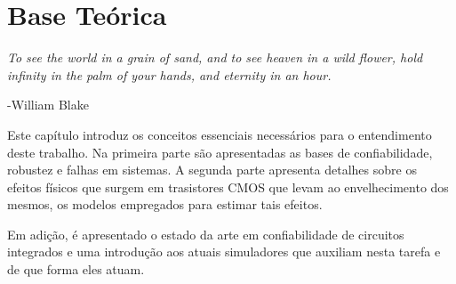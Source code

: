 \chapter{Base Teórica}
\epigraph{\textit{To see the world in a grain of sand, and to see heaven in a wild flower, hold infinity in the palm of your hands, and eternity in an hour.}}{-William Blake}
Este capítulo introduz os conceitos essenciais necessários para o entendimento deste trabalho. Na primeira parte são apresentadas as bases de confiabilidade, robustez e falhas em sistemas. A segunda parte apresenta detalhes sobre os efeitos físicos que surgem em trasistores CMOS que levam ao envelhecimento dos mesmos, os modelos empregados para estimar tais efeitos.

Em adição, é apresentado o estado da arte em confiabilidade de circuitos integrados e uma introdução aos atuais simuladores que auxiliam nesta tarefa e de que forma eles atuam.
